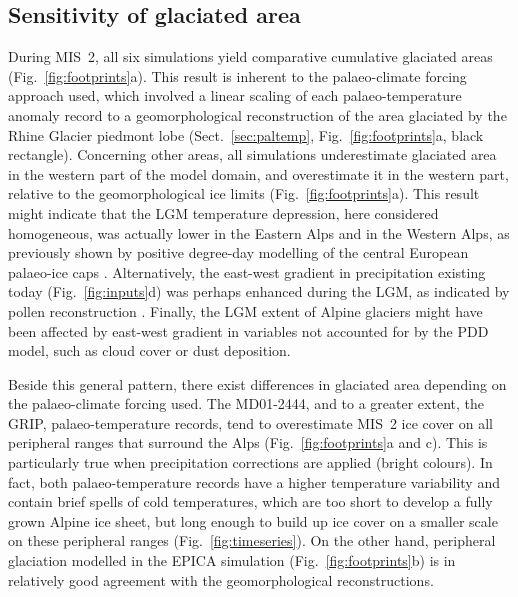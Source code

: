 \documentclass[tc, manuscript]{copernicus}
\begin{document}
\subsection{Sensitivity of glaciated area}
\label{sec:footprints}

    During MIS~2, all six simulations yield comparative cumulative glaciated
    areas (Fig.~\ref{fig:footprints}a). This result is inherent to the
    palaeo-climate forcing approach used, which involved a linear scaling of
    each palaeo-temperature anomaly record to a geomorphological
    reconstruction of the area glaciated by the Rhine Glacier piedmont lobe
    (Sect.~\ref{sec:paltemp}, Fig.~\ref{fig:footprints}a, black rectangle).
    Concerning other areas, all simulations underestimate glaciated area in the
    western part of the model domain, and overestimate it in the western
    part, relative to the geomorphological ice limits
    (Fig.~\ref{fig:footprints}a). This result might indicate that the LGM
    temperature depression, here considered homogeneous, was actually lower in
    the Eastern Alps and in the Western Alps, as previously shown by positive
    degree-day modelling of the central European palaeo-ice caps
    \citep{Heyman.etal.2013}. Alternatively, the east-west
    gradient in precipitation existing today (Fig.~\ref{fig:inputs}d) was
    perhaps enhanced during the LGM, as indicated by pollen reconstruction
    \citep{Wu.etal.2007}. Finally, the LGM extent of Alpine glaciers might have
    been affected by east-west gradient in variables not accounted for
    by the PDD model, such as cloud cover or dust deposition.

    Beside this general pattern, there exist differences in glaciated area
    depending on the palaeo-climate forcing used. The MD01-2444, and to a
    greater extent, the GRIP, palaeo-temperature records, tend to overestimate
    MIS~2 ice cover on all peripheral ranges that surround the Alps
    (Fig.~\ref{fig:footprints}a and c). This is particularly true when
    precipitation corrections are applied (bright colours). In fact, both
    palaeo-temperature records have a higher temperature variability and
    contain brief spells of cold temperatures, which are too short to develop a
    fully grown Alpine ice sheet, but long enough to build up ice cover on a
    smaller scale on these peripheral ranges (Fig.~\ref{fig:timeseries}). On
    the other hand, peripheral glaciation modelled in the EPICA simulation
    (Fig.~\ref{fig:footprints}b) is in relatively good agreement with the
    geomorphological reconstructions.
\end{document}
